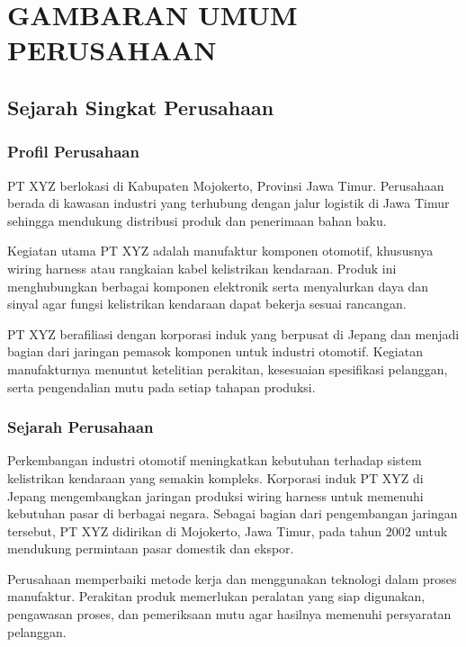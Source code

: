 \chapter{GAMBARAN UMUM PERUSAHAAN}
\section{Sejarah Singkat Perusahaan}

\subsection{Profil Perusahaan}

PT XYZ berlokasi di Kabupaten Mojokerto, Provinsi Jawa Timur. Perusahaan berada di kawasan industri yang terhubung dengan jalur logistik di Jawa Timur sehingga mendukung distribusi produk dan penerimaan bahan baku.

Kegiatan utama PT XYZ adalah manufaktur komponen otomotif, khususnya wiring harness atau rangkaian kabel kelistrikan kendaraan. Produk ini menghubungkan berbagai komponen elektronik serta menyalurkan daya dan sinyal agar fungsi kelistrikan kendaraan dapat bekerja sesuai rancangan.

PT XYZ berafiliasi dengan korporasi induk yang berpusat di Jepang dan menjadi bagian dari jaringan pemasok komponen untuk industri otomotif. Kegiatan manufakturnya menuntut ketelitian perakitan, kesesuaian spesifikasi pelanggan, serta pengendalian mutu pada setiap tahapan produksi.

\subsection{Sejarah Perusahaan}

Perkembangan industri otomotif meningkatkan kebutuhan terhadap sistem kelistrikan kendaraan yang semakin kompleks. Korporasi induk PT XYZ di Jepang mengembangkan jaringan produksi wiring harness untuk memenuhi kebutuhan pasar di berbagai negara. Sebagai bagian dari pengembangan jaringan tersebut, PT XYZ didirikan di Mojokerto, Jawa Timur, pada tahun 2002 untuk mendukung permintaan pasar domestik dan ekspor.

Perusahaan memperbaiki metode kerja dan menggunakan teknologi dalam proses manufaktur. Perakitan produk memerlukan peralatan yang siap digunakan, pengawasan proses, dan pemeriksaan mutu agar hasilnya memenuhi persyaratan pelanggan.

